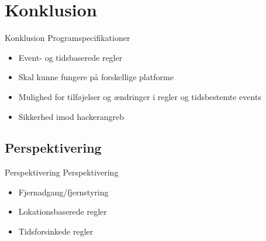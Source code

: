 \section{Konklusion}
\begin{frame}{Konklusion}{}
Programspecifikationer
\begin{itemize}
\item Event- og tidsbaserede regler
\item Skal kunne fungere på forskellige platforme
\item Mulighed for tilføjelser og ændringer i regler og tidsbestemte events
\item Sikkerhed imod hackerangreb
\end{itemize}
\end{frame}
\subsection{Perspektivering}
\begin{frame}{Perspektivering}{}
Perspektivering
\begin{itemize}
\item Fjernadgang/fjernstyring
\item Lokationsbaserede regler
\item Tidsforsinkede regler
\end{itemize}
\end{frame}